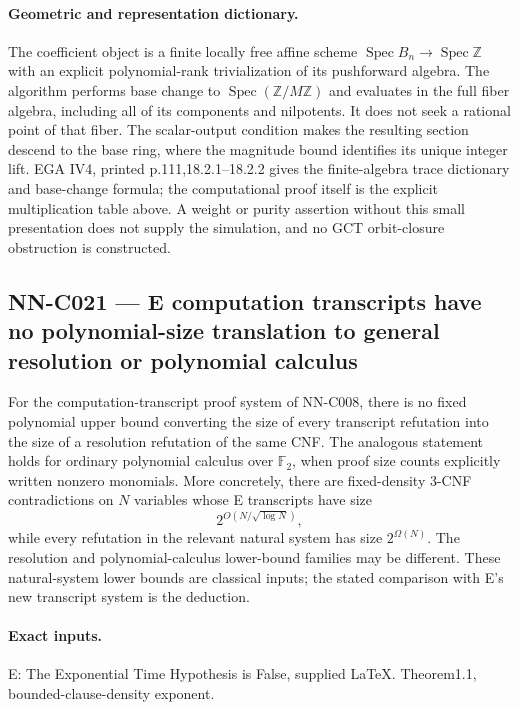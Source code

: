 \paragraph{Geometric and representation dictionary.}
The coefficient object is a finite locally free affine scheme $\operatorname{Spec}B_n\to\operatorname{Spec}\mathbb Z$ with an explicit polynomial-rank trivialization of its pushforward algebra. The algorithm performs base change to $\operatorname{Spec}(\mathbb Z/M\mathbb Z)$ and evaluates in the full fiber algebra, including all of its components and nilpotents. It does not seek a rational point of that fiber. The scalar-output condition makes the resulting section descend to the base ring, where the magnitude bound identifies its unique integer lift. EGA IV4, printed p.111,18.2.1--18.2.2 gives the finite-algebra trace dictionary and base-change formula; the computational proof itself is the explicit multiplication table above. A weight or purity assertion without this small presentation does not supply the simulation, and no GCT orbit-closure obstruction is constructed.

\subsection{NN-C021 --- E computation transcripts have no polynomial-size translation to general resolution or polynomial calculus}
\begin{proposition}[NN-C021]
For the computation-transcript proof system of NN-C008, there is no fixed polynomial upper bound converting the size of every transcript refutation into the size of a resolution refutation of the same CNF. The analogous statement holds for ordinary polynomial calculus over $\mathbb F_2$, when proof size counts explicitly written nonzero monomials. More concretely, there are fixed-density 3-CNF contradictions on $N$ variables whose E transcripts have size
\[
 2^{O(N/\sqrt{\log N})},
\]
while every refutation in the relevant natural system has size $2^{\Omega(N)}$. The resolution and polynomial-calculus lower-bound families may be different. These natural-system lower bounds are classical inputs; the stated comparison with E's new transcript system is the deduction.
\end{proposition}
\paragraph{Exact inputs.}
E: The Exponential Time Hypothesis is False, supplied LaTeX. Theorem1.1, bounded-clause-density exponent.


